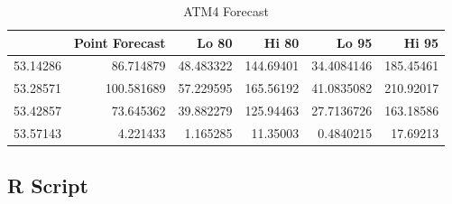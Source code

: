 \documentclass[openany]{book}
\begin{document}
\begin{table}[H]

\caption{\label{tab:unnamed-chunk-11}ATM4 Forecast}
\centering
\begin{tabular}{l|r|r|r|r|r}
\hline
\textbf{ } & \textbf{Point Forecast} & \textbf{Lo 80} & \textbf{Hi 80} & \textbf{Lo 95} & \textbf{Hi 95}\\
\hline
\rowcolor{gray!6}  53.14286 & 86.714879 & 48.483322 & 144.69401 & 34.4084146 & 185.45461\\
\hline
53.28571 & 100.581689 & 57.229595 & 165.56192 & 41.0835082 & 210.92017\\
\hline
\rowcolor{gray!6}  53.42857 & 73.645362 & 39.882279 & 125.94463 & 27.7136726 & 163.18586\\
\hline
53.57143 & 4.221433 & 1.165285 & 11.35003 & 0.4840215 & 17.69213\\
\hline
\end{tabular}
\end{table}

\hypertarget{Part-A-RScript}{%
\subsection*{R Script}\label{Part-A-RScript}}
\end{document}
